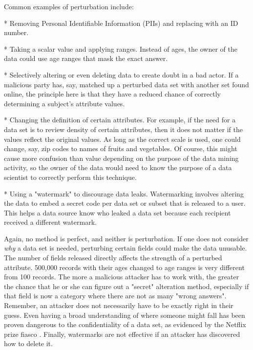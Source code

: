 \documentclass[10pt,journal,compsoc]{IEEEtran}
\begin{document}
	Common examples of perturbation include:\linebreak
	
	* Removing Personal Identifiable Information (PIIs) and replacing with an ID number. \linebreak
	
	* Taking a scalar value and applying ranges.  Instead of ages, the owner of the data could use age ranges that mask the exact answer.\linebreak
	
	* Selectively altering or even deleting data to create doubt in a bad actor.  If a malicious party has, say, matched up a perturbed data set with another set found online, the principle here is that they have a reduced chance of correctly determining a subject's attribute values. 
	 
	* Changing the definition of certain attributes.  For example, if the need for a data set is to review density of certain attributes, then it does not matter if the values reflect the original values.  As long as the correct scale is used, one could change, say, zip codes to names of fruits and vegetables.  Of course, this might cause more confusion than value depending on the purpose of the data mining activity, so the owner of the data would need to know the purpose of a data scientist to correctly perform this technique.\linebreak
	
	* Using a "watermark" to discourage data leaks.  Watermarking involves altering the data to embed a secret code per data set or subset that is released to a user.  This helps a data source know who leaked a data set because each recipient received a different watermark.\linebreak
	
	Again, no method is perfect, and neither is perturbation.  If one does not consider \textit{why} a data set is needed, perturbing certain fields could make the data unusable.  The number of fields released directly affects the strength of a perturbed attribute.  500,000 records with their ages changed to age ranges is very different from 100 records.  The more a malicious attacker has to work with, the greater the chance that he or she can figure out a "secret" alteration method, especially if that field is now a category where there are not as many "wrong answers".  Remember, an attacker does not necessarily have to be exactly right in their guess.  Even having a broad understanding of where someone might fall has been proven dangerous to the confidentiality of a data set, as evidenced by the Netflix prize fiasco \cite{narayanan}.  Finally, watermarks are not effective if an attacker has discovered how to delete it.  
	
\end{document}
